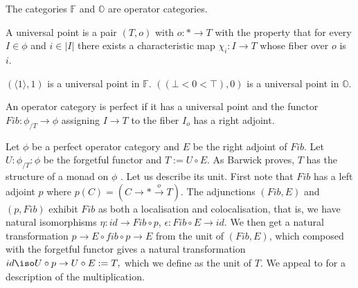 \begin{example}
    The categories $\mathbb{F}$ and $\mathbb{O}$ are operator categories.
\end{example}

\begin{definition}
    A universal point is a pair $(T,o)$ with $o:*\rightarrow T$ with the property that for every $I\in \phi$ and $i\in |I|$ there exists a characteristic map $\chi_i:I\rightarrow T$ whose fiber over $o$ is $i.$
\end{definition}

\begin{example}
    $(\langle 1 \rangle,1)$ is a universal point in $\mathbb{F}.$ $((\bot<0<\top),0)$ is a universal point in $\mathbb{O}.$
\end{example}
\begin{definition}
    An operator category is perfect if it has a universal point and the functor $Fib:\phi_{/T}\rightarrow \phi$ assigning $I\rightarrow T$ to the fiber $I_o$ has a right adjoint.
\end{definition}

Let $\phi$ be a perfect operator category and $E$ be the right adjoint of $Fib.$ Let $U:\phi_{/T}:\phi$ be the forgetful functor and $T:=U\circ E.$ As Barwick proves, $T$ has the structure of a monad on $\phi$ \cite{Bar18}. Let us describe its unit. First note that $Fib$ has a left adjoint $p$ where $p(C)=(C\rightarrow *\xrightarrow{o} T)$. The adjunctions $(Fib,E)$ and $(p,Fib)$ exhibit $Fib$ as both a localisation and colocalisation, that is, we have natural isomorphisms $\eta:id\rightarrow Fib\circ p$, $\epsilon: Fib\circ E \rightarrow id.$ We then get a natural transformation $p\rightarrow E\circ fib \circ p \rightarrow E$ from the unit of $(Fib,E)$, which composed with the forgetful functor gives a natural transformation $id\iso U\circ p\rightarrow U\circ E := T,$ which we define as the unit of $T$. We appeal to \cite{Bar18} for a description of the multiplication.  %

